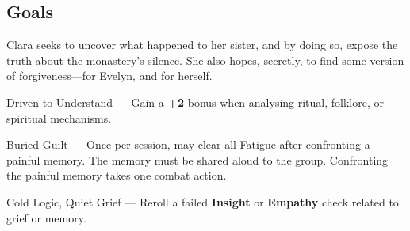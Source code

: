 \documentclass[nodeprecatedcode,bg=print]{dndbook/dndbook}
\begin{document}
\begin{WyrdCharacterSheet}
    \subsection{Goals}
    Clara seeks to uncover what happened to her sister, and by doing so, expose the truth about the monastery’s silence. She also hopes, secretly, to find some version of forgiveness—for Evelyn, and for herself.
  
    \begin{WyrdStatsBlock}[profile=img/characters/clara_ashcroft]
        \SkillsBox[%
            expert={Lore},%
            skilled={Investigation, Insight},%
            novice={Awareness, Empathy, Focus},%
        ]
  
        \begin{TraitsBox}
            \item[Driven to Understand] — Gain a \textbf{+2} bonus when analysing ritual, folklore, or spiritual mechanisms.
            \item[Buried Guilt] — Once per session, may clear all Fatigue after confronting a painful memory. The memory must be shared aloud to the group. Confronting the painful memory takes one combat action.
            \item[Cold Logic, Quiet Grief] — Reroll a failed \textbf{Insight} or \textbf{Empathy} check related to grief or memory.
        \end{TraitsBox}
  
        \DamageBox[]

    \end{WyrdStatsBlock}
  \end{WyrdCharacterSheet}
  
\end{document}
